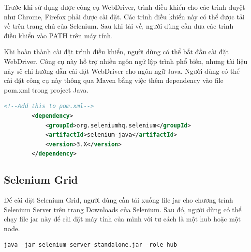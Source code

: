 \documentclass[./../main_file.tex]{subfiles}
\begin{document}
	Trước khi sử dụng được công cụ WebDriver, trình điều khiển cho các trình duyệt như Chrome, Firefox phải được cài đặt. Các trình điều khiển này có thể được tải về trên trang chủ của Selenium. Sau khi tải về, người dùng cần đưa các trình điều khiển vào PATH trên máy tính.
	
	Khi hoàn thành cài đặt trình điều khiển, người dùng có thể bắt đầu cài đặt WebDriver. Công cụ này hỗ trợ nhiều ngôn ngữ lập trình phổ biến, nhưng tài liệu này sẽ chỉ hướng dẫn cài đặt WebDriver cho ngôn ngữ Java. Người dùng có thể cài đặt công cụ này thông qua Maven bằng việc thêm dependency vào file pom.xml trong project Java.
	
	\begin{lstlisting}[language=XML,caption=pom.xml]
		<!--Add this to pom.xml-->
		<dependency>
			<groupId>org.seleniumhq.selenium</groupId>
			<artifactId>selenium-java</artifactId>
			<version>3.X</version>
		</dependency>
	\end{lstlisting}

	\subsection{Selenium Grid}
	
	Để cài đặt Selenium Grid, người dùng cần tải xuống file jar cho chương trình Selenium Server trên trang Downloads của Selenium. Sau đó, người dùng có thể chạy file jar này để cài đặt máy tính của mình với tư cách là một hub hoặc một node.
	
	\begin{lstlisting}[caption=Lệnh để chạy Selenium Server]
		java -jar selenium-server-standalone.jar -role hub
	\end{lstlisting}
	
\end{document}
